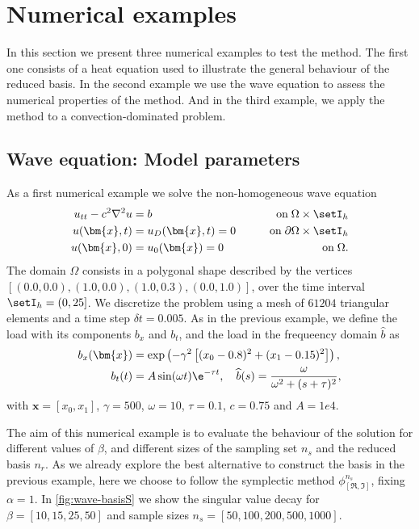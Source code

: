 \section{Numerical examples} \label{sec:Examples}
In this section we present three numerical examples to test the method.
The first one consists of a heat equation used to illustrate the general behaviour of the reduced basis. In the second example we use the wave equation to assess the numerical properties of the method. And in the third example, we apply the method to a convection-dominated problem.

\subsection{Wave equation: Model parameters} \label{ssec:Wave}

As a first numerical example we solve the non-homogeneous wave equation
\begin{alignat}{2} \label{eq:wave}
    u_{tt} - c^2 \nabla^2 u &= b &\qquad \text{on} \; \Omega \times \setI_h \\
    u(\bm{x},t) &= u_D(\bm{x},t) = 0 &\qquad \text{on} \; \partial \Omega \times \setI_h \\
    u(\bm{x},0) &= u_0(\bm{x}) = 0 &\qquad \text{on} \; \Omega.
\end{alignat}
The domain $\Omega$ consists in a polygonal shape described by the vertices $[(0.0,0.0),(1.0,0.0),(1.0,0.3),(0.0,1.0)]$, over the time interval $\setI_h = (0,25]$. We discretize the problem using a mesh of $61204$ triangular elements and a time step $\delta t = 0.005$. As in the previous example, we define the load with its components $b_x$ and $b_t$, and the load in the frequeency domain $\widehat{b}$ as
\begin{align}
    b_x(\bm{x}) &= \exp \left(-\gamma^2 \left[(x_0-0.8)^2 + (x_1-0.15)^2 \right] \right), \\
    b_t(t) &= A \sin(\omega t) \e^{-\tau t}, \quad \widehat{b}(s) = \frac{\omega}{\omega^2 +(s+\tau)^2},
\end{align}
with $\bm{x}=[x_0,x_1]$, $\gamma=500$, $\omega=10$, $\tau=0.1$, $c=0.75$ and $A=1e4$.

The aim of this numerical example is to evaluate the behaviour of the solution for different values of $\beta$, and different sizes of the sampling set $n_s$ and the reduced basis $n_r$. As we already explore the best alternative to construct the basis in the previous example, here we choose to follow the symplectic method $\phi_{[\Re,\Im]}^{n_s}$, fixing $\alpha=1$.
In \cref{fig:wave-basisS} we show the singular value decay for $\beta = [10, 15, 25, 50]$ and sample sizes $n_s = [50, 100, 200, 500, 1000]$.

